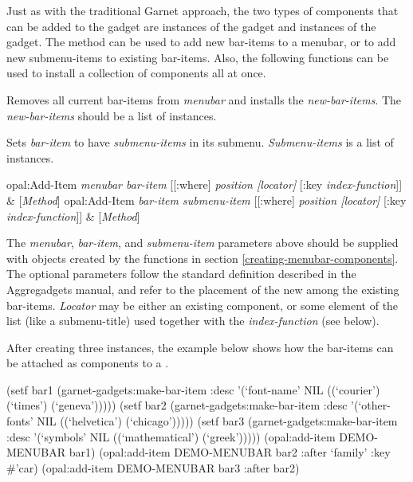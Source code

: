 Just as with the traditional Garnet approach, the two types of components
that can be added to the  gadget are instances of the 
gadget and instances of
the  gadget.  The  method can be used to add
new bar-items to a menubar, or to add new submenu-items to existing bar-items.
Also, the following  functions can be used to install a collection
of components all at once.

Removes all current bar-items from {\it menubar} and installs the
{\it new-bar-items}.  The {\it new-bar-items} should be a list of 
instances.

Sets {\it bar-item} to have {\it submenu-items} in its submenu.
{\it Submenu-items} is a list of  instances.


\begin{programexample}
opal:Add-Item {\it menubar bar-item} [[:where] {\it position [locator]} [:key {\it index-function}]] & [{\it Method}]
opal:Add-Item {\it bar-item submenu-item} [[:where] {\it position [locator]} [:key {\it index-function}]] & [{\it Method}]
\end{programexample}

The {\it menubar}, {\it bar-item}, and {\it submenu-item} parameters above should be
supplied with objects created by the functions in section
\ref{creating-menubar-components}.  The optional parameters follow the
standard  definition described in the Aggregadgets manual, and
refer to the placement of the new  among the existing bar-items.
{\it Locator} may be either an existing  component,
or some element of the  list (like a submenu-title) used together
with the {\it index-function} (see below).

After creating three  instances, the example below shows how
the bar-items can be attached as components to a .

\begin{programexample}
(setf bar1 (garnet-gadgets:make-bar-item
             :desc '(`font-name' NIL ((`courier') (`times') (`geneva')))))
(setf bar2 (garnet-gadgets:make-bar-item
             :desc '(`other-fonts' NIL ((`helvetica') (`chicago')))))
(setf bar3 (garnet-gadgets:make-bar-item
             :desc '(`symbols' NIL ((`mathematical') (`greek')))))
(opal:add-item DEMO-MENUBAR bar1)
(opal:add-item DEMO-MENUBAR bar2 :after `family' :key \#'car)
(opal:add-item DEMO-MENUBAR bar3 :after bar2)
\end{programexample}

